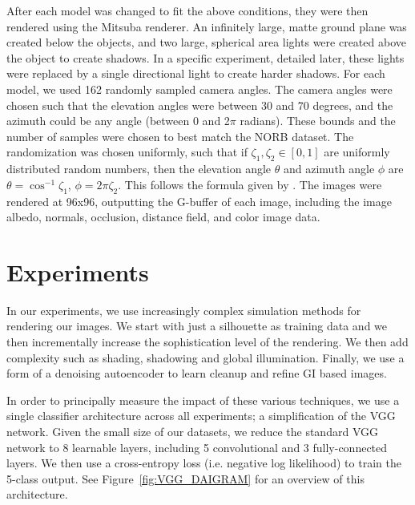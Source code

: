 \documentclass[10pt,twocolumn,letterpaper]{article}
\begin{document}
After each model was changed to fit the above conditions, they were then rendered using the Mitsuba renderer. An infinitely large, matte ground plane was created below the objects, and two large, spherical area lights were created above the object to create shadows. In a specific experiment, detailed later, these lights were replaced by a single directional light to create harder shadows. For each model, we used 162 randomly sampled camera angles. The camera angles were chosen such that the elevation angles were between 30 and 70 degrees, and the azimuth could be any angle (between 0 and 2$\pi$ radians). These bounds and the number of samples were chosen to best match the NORB dataset. The randomization was chosen uniformly, such that if $\zeta_1,\zeta_2\in[0,1]$ are uniformly distributed random numbers, then the elevation angle $\theta$ and azimuth angle $\phi$ are $\theta = \cos^{-1}\zeta_1$, $\phi = 2\pi \zeta_2$. This follows the formula given by \cite{Pharr:2010:PBR:1854996}. The images were rendered at 96x96, outputting the G-buffer of each image, including the image albedo, normals, occlusion, distance field, and color image data.

\section{Experiments}

In our experiments, we use increasingly complex simulation methods for rendering our images.  We start with just a silhouette as training data and we then incrementally increase the sophistication level of the rendering.  We then add complexity such as shading, shadowing and global illumination. Finally, we use a form of a denoising autoencoder to learn cleanup and refine GI based images.%

In order to principally measure the impact of these various techniques, we use a single classifier architecture across all experiments; a simplification of the VGG network\cite{DBLP:journals/corr/SimonyanZ14a}. Given the small size of our datasets, we reduce the standard VGG network to 8 learnable layers, including 5 convolutional and 3 fully-connected layers. We then use a cross-entropy loss (i.e. negative log likelihood) to train the 5-class output. See 
Figure~\ref{fig:VGG_DAIGRAM} for an overview of this architecture.
\end{document}

